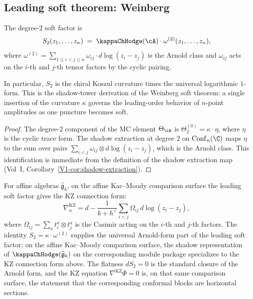 \subsection{Leading soft theorem: Weinberg}

\begin{theorem}
The degree-$2$ soft factor is
\begin{equation}
S_2(z_1, \ldots, z_n)
\;=\;
\kappaChHodge(\cA) \cdot \omega^{(2)}(z_1, \ldots, z_n),
\end{equation}
where $\omega^{(2)} = \sum_{1 \leq i < j \leq n} \omega_{ij} \cdot d\log(z_i - z_j)$
is the Arnold class and $\omega_{ij}$ acts on the $i$-th and $j$-th tensor factors
by the cyclic pairing.

In particular, $S_2$ is the chiral Koszul curvature times the universal
logarithmic $1$-form. This is the shadow-tower derivation of the Weinberg soft
theorem: a single insertion of the curvature $\kappa$ governs the leading-order
behavior of $n$-point amplitudes as one puncture becomes soft.
\end{theorem}

\begin{proof}
The degree-$2$ component of the MC element $\Theta_\cA$ is
$\Theta^{(0)}_2 = \kappa \cdot \eta$, where $\eta$ is the cyclic trace form.
The shadow extraction at degree $2$ on $\mathrm{Conf}_n(\C)$ maps $\eta$ to the
sum over pairs $\sum_{i < j} \omega_{ij} \otimes d\log(z_i - z_j)$, which is the
Arnold class. This identification is immediate from the definition of the shadow
extraction map (Vol~I, Corollary~\ref*{V1-cor:shadow-extraction}).
\end{proof}

\begin{remark}[KZ connection]
For affine algebras $\widehat{\mathfrak{g}}_k$, on the affine Kac--Moody
comparison surface the leading soft factor gives the KZ connection form:
\[
\nabla^{\mathrm{KZ}}_n = d - \frac{1}{k + h^\vee} \sum_{i < j}
\Omega_{ij} \, d\log(z_i - z_j),
\]
where $\Omega_{ij} = \sum_a t^a_i \otimes t^a_j$ is the Casimir acting on the
$i$-th and $j$-th factors. The identity $S_2 = \kappa \cdot \omega^{(2)}$
supplies the universal Arnold-form part of the leading soft factor; on the
affine Kac--Moody comparison surface, the shadow representation of
$\kappaChHodge(\widehat{\mathfrak{g}}_k)$ on the corresponding module package
specializes to the KZ connection form above.
The flatness $dS_2 = 0$ is the standard closure of the Arnold form, and the
KZ equation $\nabla^{\mathrm{KZ}} \Phi = 0$ is, on that same comparison
surface, the statement that the corresponding conformal blocks are
horizontal sections.
\end{remark}

